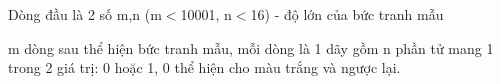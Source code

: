 Dòng đầu là 2 số m,n (m$<$10001, n$<$16) - độ lớn của bức tranh mẫu  

   m dòng sau thể hiện bức tranh mẫu, mỗi dòng là 1 dãy gồm n phần tử mang 1 trong 2 giá trị: 0 hoặc 1, 0 thể hiện cho màu trắng và ngược lại.
